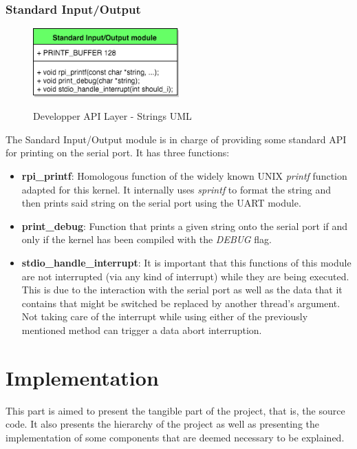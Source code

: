 \subsubsection{Standard Input/Output}

\begin{figure}[H]
\begin{center}
\includegraphics[width=0.5\textwidth]{includes/figures/chapter5_developper_api_layer_stdio_UML.png}  \\
\caption{Developper API Layer - Strings UML}
\end{center}
\label{fig:chapter5_developper_api_layer_stdio_UML}
\end{figure}

The Sandard Input/Output module is in charge of providing some standard API for printing on the serial port. It has three functions:
\begin{itemize}
	\item \textbf{rpi\_printf}: Homologous function of the widely known UNIX \textit{printf} function adapted for this kernel. It internally uses \textit{sprintf} to format the string and then prints said string on the serial port using the UART module.
	\item \textbf{print\_debug}: Function that prints a given string onto the serial port if and only if the kernel has been compiled with the \textit{DEBUG} flag.
	\item \textbf{stdio\_handle\_interrupt}: It is important that this functions of this module are not interrupted (via any kind of interrupt) while they are being executed. This is due to the interaction with the serial port as well as the data that it contains that might be switched be replaced by another thread's argument. Not taking care of the interrupt while using either of the previously mentioned method can trigger a data abort interruption.
\end{itemize}


\pagebreak




\section{Implementation}
This part is aimed to present the tangible part of the project, that is, the source code. It also presents the hierarchy of the project as well as presenting the implementation of some components that are deemed necessary to be explained.

